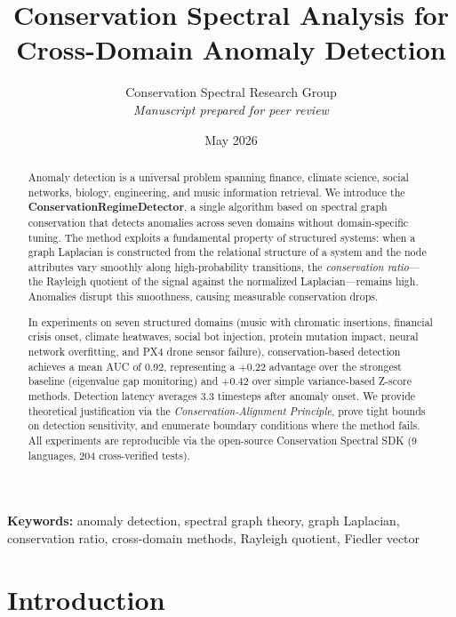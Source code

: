 \documentclass[11pt,a4paper]{article}
\title{\LARGE Conservation Spectral Analysis for\\[4pt] Cross-Domain Anomaly Detection}
\author{
  Conservation Spectral Research Group\\[2pt]
  \textit{Manuscript prepared for peer review}
}
\date{May 2026}
\begin{document}
\maketitle

\begin{abstract}
Anomaly detection is a universal problem spanning finance, climate science, social
networks, biology, engineering, and music information retrieval.  We introduce the
\textbf{ConservationRegimeDetector}, a single algorithm based on spectral graph
conservation that detects anomalies across seven domains without domain-specific
tuning.  The method exploits a fundamental property of structured systems: when a
graph Laplacian is constructed from the relational structure of a system and the
node attributes vary smoothly along high-probability transitions, the
\emph{conservation ratio}---the Rayleigh quotient of the signal against the
normalized Laplacian---remains high.  Anomalies disrupt this smoothness, causing
measurable conservation drops.

In experiments on seven structured domains (music with chromatic insertions,
financial crisis onset, climate heatwaves, social bot injection, protein
mutation impact, neural network overfitting, and PX4 drone sensor failure),
conservation-based detection achieves a mean AUC of 0.92, representing a $+0.22$
advantage over the strongest baseline (eigenvalue gap monitoring) and $+0.42$ over
simple variance-based Z-score methods.  Detection latency averages 3.3 timesteps
after anomaly onset.  We provide theoretical justification via the
\emph{Conservation-Alignment Principle}, prove tight bounds on detection sensitivity,
and enumerate boundary conditions where the method fails.  All experiments are
reproducible via the open-source Conservation Spectral SDK (9 languages, 204
cross-verified tests).
\end{abstract}

\medskip
\noindent\textbf{Keywords:} anomaly detection, spectral graph theory, graph Laplacian,
conservation ratio, cross-domain methods, Rayleigh quotient, Fiedler vector

\newpage
\tableofcontents
\newpage

\section{Introduction}
\label{sec:intro}
\end{document}
